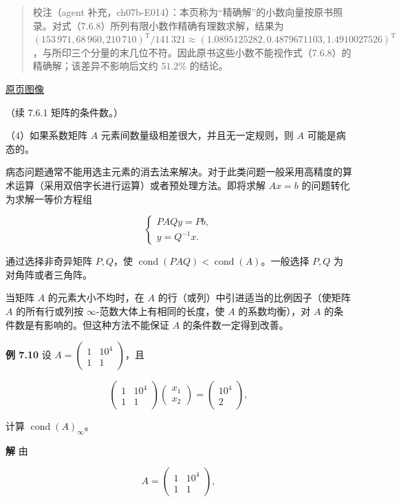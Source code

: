 \documentclass[
  10pt,
  fontset=fandol]{ctexart}
\begin{document}
\begin{quote}
校注（agent 补充，ch07b-E014）：本页称为``精确解''的小数向量按原书照录。对式（7.6.8）所列有限小数作精确有理数求解，结果为 \((153\,971,\allowbreak 68\,960,\allowbreak 210\,710)^{\mathrm T}/141\,321\approx(1.0895125282,\allowbreak 0.4879671103,\allowbreak 1.4910027526)^{\mathrm T}\)，与所印三个分量的末几位不符。因此原书这些小数不能视作式（7.6.8）的精确解；该差异不影响后文约 \(51.2\%\) 的结论。
\end{quote}

\href{../../source-images/pdf-209.jpeg}{原页图像}

（续 7.6.1 矩阵的条件数。）

（4）如果系数矩阵 \(A\) 元素间数量级相差很大，并且无一定规则，则 \(A\) 可能是病态的。

病态问题通常不能用选主元素的消去法来解决。对于此类问题一般采用高精度的算术运算（采用双倍字长进行运算）或者预处理方法。即将求解 \(Ax=b\) 的问题转化为求解一等价方程组

\[
\begin{cases}
PAQy=Pb,\\
y=Q^{-1}x.
\end{cases}
\]

通过选择非奇异矩阵 \(P,Q\)，使 \(\operatorname{cond}(PAQ)<\operatorname{cond}(A)\)。一般选择 \(P,Q\) 为对角阵或者三角阵。

当矩阵 \(A\) 的元素大小不均时，在 \(A\) 的行（或列）中引进适当的比例因子（使矩阵 \(A\) 的所有行或列按 \(\infty\)-范数大体上有相同的长度，使 \(A\) 的系数均衡），对 \(A\) 的条件数是有影响的。但这种方法不能保证 \(A\) 的条件数一定得到改善。

\textbf{例 7.10} 设 \(A=\begin{pmatrix}1&10^4\\1&1\end{pmatrix}\)，且

\[
\begin{pmatrix}1&10^4\\1&1\end{pmatrix}
\begin{pmatrix}x_1\\x_2\end{pmatrix}
=\begin{pmatrix}10^4\\2\end{pmatrix},
\tag{7.6.9}
\]

计算 \(\operatorname{cond}(A)_\infty\)。

\textbf{解} 由

\[
A=\begin{pmatrix}1&10^4\\1&1\end{pmatrix},
\]
\end{document}
